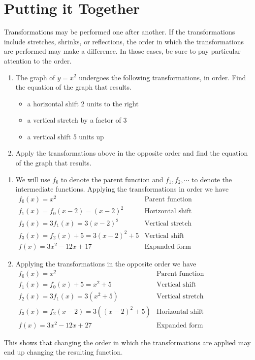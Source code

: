 \documentclass[handout, noauthor, nooutcomes]{ximera}
\begin{document}
\section{Putting it Together}
Transformations may be performed one after another. If the transformations include stretches, shrinks, or reflections, the order in which the transformations are performed may make a difference. In those cases, be sure to pay particular attention to the order.

\begin{example}
\begin{enumerate}
\item The graph of $y=x^2$ undergoes the following transformations, in order. Find the equation of the graph that results.
\begin{itemize}
\item a horizontal shift 2 units to the right
\item a vertical stretch by a factor of 3
\item a vertical shift 5 units up
\end{itemize}
\item Apply the transformations above in the opposite order and find the equation of the graph that results.
\end{enumerate}
\begin{explanation}
\begin{enumerate}
\item We will use $f_0$ to denote the parent function and $f_1, f_2, \cdots$ to denote the intermediate functions. Applying the transformations in order we have\\
$
\begin{array}{lc}
f_0(x) = x^2& \text{Parent function}\\
f_1(x) = f_0(x - 2) = (x-2)^2& \text{Horizontal shift} \\
f_2(x) =3f_1(x) = 3(x-2)^2& \text{Vertical stretch} \\
f_3(x) = f_2(x) + 5 = 3(x-2)^2+5& \text{Vertical shift}\\
f(x) = 3x^2 - 12x + 17& \text{Expanded form}
\end{array}
$
\item Applying the transformations in the opposite order we have\\
$
\begin{array}{lc}
f_0(x) = x^2& \text{Parent function}\\
f_1(x) = f_0(x) + 5 = x^2 + 5 & \text{Vertical shift} \\
f_2(x) = 3f_1(x) = 3(x^2+5)& \text{Vertical stretch} \\
f_3(x) = f_2(x - 2) = 3((x-2)^2+5) & \text{Horizontal shift}\\
f(x) = 3x^2 - 12x + 27& \text{Expanded form}
\end{array}
$
\end{enumerate}
This shows that changing the order in which the transformations are applied may end up changing the resulting function. 
\end{explanation}
\end{example}
\end{document}
